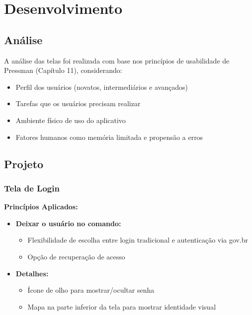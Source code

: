 \documentclass[a4paper, 12pt]{article}
\begin{document}
\section{Desenvolvimento}

\subsection{Análise}
A análise das telas foi realizada com base nos princípios de usabilidade de Pressman (Capítulo 11), considerando:
\begin{itemize}
\item Perfil dos usuários (novatos, intermediários e avançados)
\item Tarefas que os usuários precisam realizar
\item Ambiente físico de uso do aplicativo
\item Fatores humanos como memória limitada e propensão a erros
\end{itemize}

\subsection{Projeto}
\subsubsection{Tela de Login}
\textbf{Princípios Aplicados:}
\begin{itemize}[leftmargin=*]
    \item \textbf{Deixar o usuário no comando:}
    \begin{itemize}
        \item Flexibilidade de escolha entre login tradicional e autenticação via gov.br
        \item Opção de recuperação de acesso
    \end{itemize}

    \item \textbf{Detalhes:}
    \begin{itemize}
        \item Ícone de olho para mostrar/ocultar senha
        \item Mapa na parte inferior da tela para mostrar identidade visual
    \end{itemize}
\end{itemize}
\end{document}
